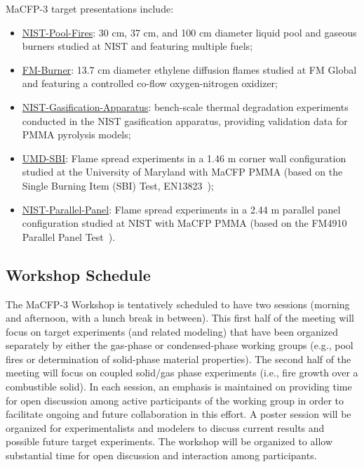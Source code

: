 \documentclass[12pt]{article}
\begin{document}
MaCFP-3 target presentations include:
\begin{itemize}[noitemsep]
\item \href{https://github.com/MaCFP/macfp-db/tree/master/Liquid_Pool_Fires/NIST_Pool_Fires}{NIST-Pool-Fires}: 30 cm, 37 cm, and 100 cm diameter liquid pool and gaseous burners studied at NIST and featuring multiple fuels;
\item \href{https://github.com/MaCFP/macfp-db/tree/master/Extinction/FM_Burner}{FM-Burner}: 13.7 cm diameter ethylene diffusion flames studied at FM Global and featuring a controlled co-flow oxygen-nitrogen oxidizer;
\item \href{https://github.com/MaCFP/matl-db/tree/master/PMMA/Validation_Data/NIST_Gasification_Apparatus}{NIST-Gasification-Apparatus}: bench-scale thermal degradation experiments conducted in the NIST gasification apparatus, providing validation data for PMMA pyrolysis models;
\item \href{https://github.com/MaCFP/macfp-db/tree/master/Fire_Growth/UMD_SBI}{UMD-SBI}: Flame spread experiments in a 1.46 m corner wall configuration studied at the University of Maryland with MaCFP PMMA (based on the Single Burning Item (SBI) Test, EN13823~\cite{EN-13823standard});
\item \href{https://github.com/MaCFP/macfp-db/tree/master/Fire_Growth/NIST_Parallel_Panel}{NIST-Parallel-Panel}: Flame spread experiments in a 2.44 m parallel panel configuration studied at NIST with MaCFP PMMA (based on the FM4910 Parallel Panel Test~\cite{FM-4910standard}).
\end{itemize}


\subsection{Workshop Schedule}

The MaCFP-3 Workshop is tentatively scheduled to have two sessions (morning and afternoon, with a lunch break in between). This first half of the meeting will focus on target experiments (and related modeling) that have been organized separately by either the gas-phase or condensed-phase working groups (e.g., pool fires or determination of solid-phase material properties). The second half of the meeting will focus on coupled solid/gas phase experiments (i.e., fire growth over a combustible solid). In each session, an emphasis is maintained on providing time for open discussion among active participants of the working group in order to facilitate ongoing and future collaboration in this effort. A poster session will be organized for experimentalists and modelers to discuss current results and possible future target experiments. The workshop will be organized to allow substantial time for open discussion and interaction among participants.\\
\end{document}
